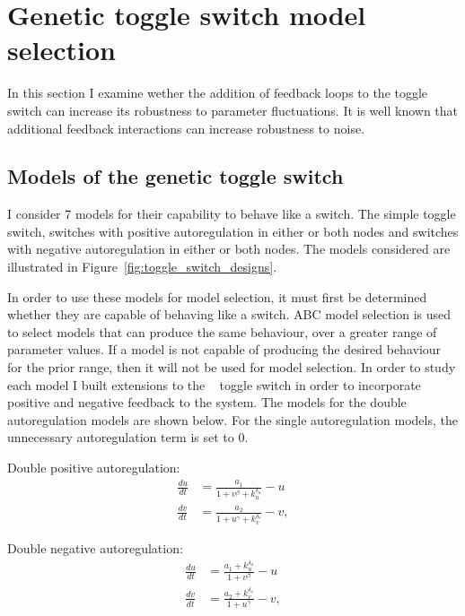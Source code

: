\section{Genetic toggle switch model selection}

In this section I examine wether the addition of feedback loops to the toggle switch can increase its robustness to parameter fluctuations. It is well known that additional feedback interactions can increase robustness to  noise. 

\subsection{Models of the genetic toggle switch}
\label{sec:models_bist}

I consider 7 models for their capability to behave like a switch. The simple toggle switch, switches with positive autoregulation in either or both nodes and switches with negative autoregulation in either or both nodes. The models considered are illustrated in Figure~\ref{fig:toggle_switch_designs}. 


In order to use these models for model selection, it must first be determined whether they are capable of behaving like a switch. ABC model selection is used to select models that can produce the same behaviour, over a greater range of parameter values. If a model is not capable of producing the desired behaviour for the prior range, then it will not be used for model selection. In order to study each model I built extensions to the ~\autocite{Gardner:2000vha} toggle switch in order to incorporate positive and negative feedback to the system.  The models for the double autoregulation models are shown below. For the single autoregulation models, the unnecessary autoregulation term is set to 0.

Double positive autoregulation: 
\begin{align}\label{eq:gards_neg}
\frac{du}{dt} &= \frac{a_1}{1+v^{\beta} + k_{u}^{\delta_{u}}} - u \\
\frac{dv}{dt} &= \frac{a_2}{1+u^{\gamma }+ k_{v}^{\delta_{v}}} - v,
\end{align}

Double negative autoregulation: 
\begin{align}\label{eq:gards_pos}
\frac{du}{dt} &= \frac{a_1+ k_{u}^{\delta_{u}}}{1+v^{\beta}} - u \\
\frac{dv}{dt} &= \frac{a_2+ k_{v}^{\delta_{v}}}{1+u^{\gamma }} - v,
\end{align}

